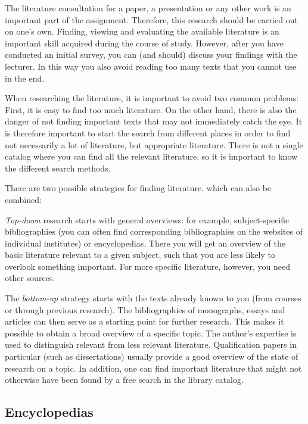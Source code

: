 \documentclass[
  english,
]{scrreprt}
\begin{document}
The literature consultation for a paper, a presentation or any other work is an important part of the assignment. Therefore, this research should be carried out on one’s own. Finding, viewing and evaluating the available literature is an important skill acquired during the course of study. However, after you have conducted an initial survey, you can (and should) discuss your findings with the lecturer. In this way you also avoid reading too many texts that you cannot use in the end.

When researching the literature, it is important to avoid two common problems: First, it is easy to find too much literature. On the other hand, there is also the danger of not finding important texts that may not immediately catch the eye. It is therefore important to start the search from different places in order to find not necessarily a lot of literature, but appropriate literature. There is not a single catalog where you can find all the relevant literature, so it is important to know the different search methods.

There are two possible strategies for finding literature, which can also be combined:

\emph{Top-down} research starts with general overviews: for example, subject-specific bibliographies (you can often find corresponding bibliographies on the websites of individual institutes) or encyclopedias. There you will get an overview of the basic literature relevant to a given subject, such that you are less likely to overlook something important. For more specific literature, however, you need other sources.

The \emph{bottom-up} strategy starts with the texts already known to you (from courses or through previous research). The bibliographies of monographs, essays and articles can then serve as a starting point for further research. This makes it possible to obtain a broad overview of a specific topic. The author’s expertise is used to distinguish relevant from less relevant literature. Qualification papers in particular (such as dissertations) usually provide a good overview of the state of research on a topic. In addition, one can find important literature that might not otherwise have been found by a free search in the library catalog.

\subsection{Encyclopedias}\label{encyclopedias}
\end{document}
